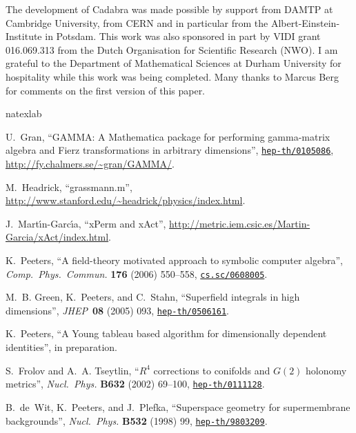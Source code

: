 \documentclass[11pt]{article}
\begin{document}
The development of Cadabra was made possible by support from
DAMTP at Cambridge University, from CERN and in particular from the
Albert-Einstein-Institute in Potsdam.  This work was also sponsored in
part by VIDI grant 016.069.313 from the Dutch Organisation for
Scientific Research (NWO).  I am grateful to the Department of
Mathematical Sciences at Durham University for hospitality while this
work was being completed. Many thanks to Marcus Berg for comments on
the first version of this paper.

%
%
\begingroup\raggedright\begin{thebibliography}{8}
\expandafter\ifx\csname natexlab\endcsname\relax\def\natexlab#1{#1}\fi

U.~Gran, ``{GAMMA}: A {Mathematica} package for performing gamma-matrix algebra
  and {Fierz} transformations in arbitrary dimensions'',
  \href{http://xxx.lanl.gov/abs/hep-th/0105086}{{\tt hep-th/0105086}},
\url{http://fy.chalmers.se/~gran/GAMMA/}.

M.~Headrick, ``grassmann.m'',
  \url{http://www.stanford.edu/~headrick/physics/index.html}.

J.~{Mart\'\i{}n-Garc\'\i{}a}, ``{xPerm and xAct}'',
  \url{http://metric.iem.csic.es/Martin-Garcia/xAct/index.html}.

K.~Peeters, ``A field-theory motivated approach to symbolic computer algebra'',
  {\em Comp.\ Phys.\ Commun.} {\bf 176} (2006) 550--558,
  \href{http://xxx.lanl.gov/abs/cs.sc/0608005}{{\tt cs.sc/0608005}}.

M.~B. Green, K.~Peeters, and C.~Stahn, ``Superfield integrals in high
  dimensions'', {\em JHEP\,} {\bf 08} (2005) 093,
\href{http://xxx.lanl.gov/abs/hep-th/0506161}{{\tt hep-th/0506161}}.

K.~Peeters, ``A {Young} tableau based algorithm for dimensionally dependent
  identities'', in preparation.

S.~Frolov and A.~A. Tseytlin, ``{$R^4$ corrections to conifolds and $G(2)$
  holonomy metrics}'', {\em Nucl.\ Phys.} {\bf B632} (2002) 69--100,
\href{http://xxx.lanl.gov/abs/hep-th/0111128}{{\tt hep-th/0111128}}.

B.~de~Wit, K.~Peeters, and J.~Plefka, ``Superspace geometry for supermembrane
  backgrounds'', {\em Nucl.\ Phys.} {\bf B532} (1998) 99,
\href{http://xxx.lanl.gov/abs/hep-th/9803209}{{\tt hep-th/9803209}}.

\end{thebibliography}\endgroup
\end{document}
